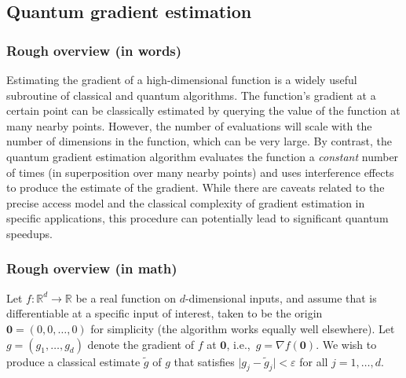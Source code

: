 
\begin{refsection}

\section{Quantum gradient estimation}\label{prim:GradientEstimation}


\subsubsection*{Rough overview (in words)}

Estimating the gradient of a high-dimensional function is a widely useful subroutine of classical and quantum algorithms. The function's gradient at a certain point can be classically estimated by querying the value of the function at many nearby points. However, the number of evaluations will scale with the number of dimensions in the function, which can be very large. By contrast, the quantum gradient estimation algorithm evaluates the function a \emph{constant} number of times (in superposition over many nearby points) and uses interference effects to produce the estimate of the gradient. While there are caveats related to the precise access model and the classical complexity of gradient estimation in specific applications, this procedure can potentially lead to significant quantum speedups. 


\subsubsection*{Rough overview (in math)}

Let $f: \mathbb{R}^d \rightarrow \mathbb{R}$ be a real function on $d$-dimensional inputs, and assume that is differentiable at a specific input of interest, taken  to be the origin $\mathbf{0} = (0,0,\ldots,0)$ for simplicity (the algorithm works equally well elsewhere). Let $g = (g_1,\ldots,g_d)$ denote the gradient of $f$ at $\mathbf{0}$, i.e.,~$g = \nabla f(\mathbf{0})$. We wish to produce a classical estimate $\tilde{g}$ of $g$ that satisfies $\lvert g_j - \tilde{g}_j \rvert < \varepsilon$ for all $j =1,\ldots, d$. 


\end{refsection}
